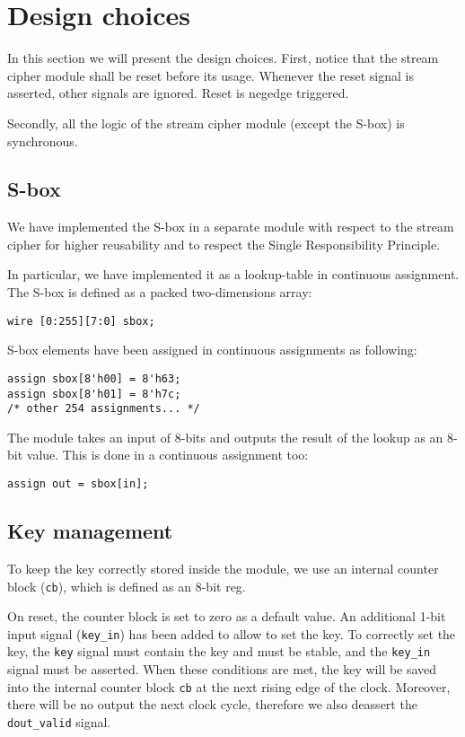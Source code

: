 \section{Design choices}
In this section we will present the design choices. First, notice that the stream cipher module shall be reset before its usage. Whenever the reset signal is asserted, other signals are ignored. Reset is negedge triggered.

Secondly, all the logic of the stream cipher module (except the S-box) is synchronous.

\subsection{S-box}
We have implemented the S-box in a separate module with respect to the stream cipher for higher reusability and to respect the Single Responsibility Principle.

In particular, we have implemented it as a lookup-table in continuous assignment. The S-box is defined as a packed two-dimensions array:
\begin{lstlisting}
wire [0:255][7:0] sbox;
\end{lstlisting}
S-box elements have been assigned in continuous assignments as following:
\begin{lstlisting}
assign sbox[8'h00] = 8'h63;
assign sbox[8'h01] = 8'h7c;
/* other 254 assignments... */
\end{lstlisting}
The module takes an input of 8-bits and outputs the result of the lookup as an 8-bit value. This is done in a continuous assignment too:
\begin{lstlisting}
assign out = sbox[in];
\end{lstlisting}

\subsection{Key management}

To keep the key correctly stored inside the module, we use an internal counter block (\lstinline{cb}), which is defined as an 8-bit reg.

On reset, the counter block is set to zero as a default value. An additional 1-bit input signal (\lstinline{key_in}) has been added to allow to set the key. To correctly set the key, the \lstinline{key} signal must contain the key and must be stable, and the \lstinline{key_in} signal must be asserted. When these conditions are met, the key will be saved into the internal counter block \lstinline{cb} at the next rising edge of the clock. Moreover, there will be no output the next clock cycle, therefore we also deassert the \lstinline{dout_valid} signal.

